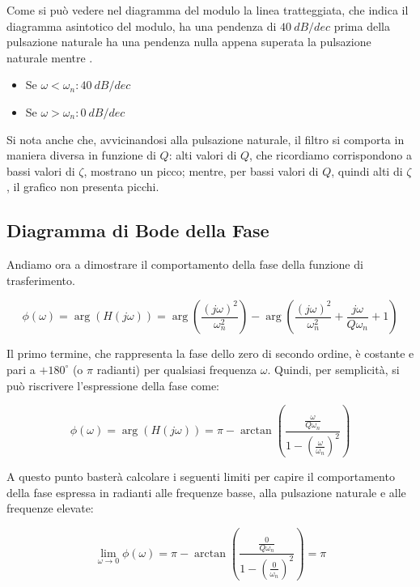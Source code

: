 Come si può vedere nel diagramma del modulo la linea tratteggiata, che indica il diagramma asintotico del modulo, ha una pendenza di $\SI{40}{dB/dec}$ prima della pulsazione naturale ha una pendenza nulla appena superata la pulsazione naturale mentre .

\begin{itemize}
    \item Se $\omega < \omega_n: \SI{40}{dB/dec}$
    \item Se $\omega > \omega_n:\SI{0}{dB/dec}$
\end{itemize}
Si nota anche che, avvicinandosi alla pulsazione naturale, il filtro si comporta in maniera diversa in funzione di $Q$: alti valori di $Q$, che ricordiamo corrispondono a bassi valori di $\zeta$, mostrano un picco; mentre, per bassi valori di $Q$, quindi alti di $\zeta$, il grafico non presenta picchi.

\subsection{Diagramma di Bode della Fase}



Andiamo ora a dimostrare il comportamento della fase della funzione di trasferimento. 

\begin{equation}
\phi(\omega) = \arg\left(H(j\omega)\right) = \arg\left(\frac{(j\omega)^2}{\omega_n^2}\right) - \arg\left(\frac{(j\omega)^2}{\omega_n^2} + \frac{j\omega}{Q\omega_n} + 1\right)
\end{equation}

Il primo termine, che rappresenta la fase dello zero di secondo ordine, è costante e pari a $+180^\circ$ (o $\pi$ radianti) per qualsiasi frequenza $\omega$. Quindi, per semplicità, si può riscrivere l'espressione della fase come:

\begin{equation}
\phi(\omega) = \arg\left(H(j\omega)\right) = \pi
-\arctan\left(\frac{\frac{\omega}{Q\omega_n}}{1-\left(\frac{\omega}{\omega_n}\right)^2}\right)
\end{equation}

A questo punto basterà calcolare i seguenti limiti per capire il comportamento della fase espressa in radianti alle frequenze basse, alla pulsazione naturale e alle frequenze elevate:

\begin{equation}
\lim_{\omega \to 0} \phi(\omega) = \pi
-\arctan\left(\frac{\frac{0}{Q\omega_n}}{1-\left(\frac{0}{\omega_n}\right)^2}\right)
= \pi
\end{equation}


